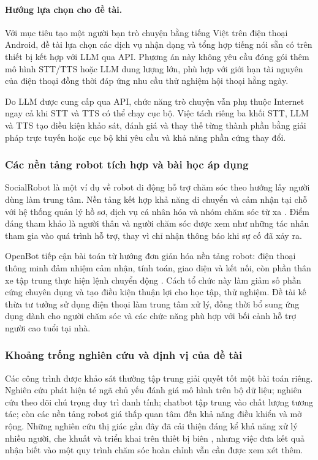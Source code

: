 \paragraph{Hướng lựa chọn cho đề tài.}
Với mục tiêu tạo một người bạn trò chuyện bằng tiếng Việt trên điện thoại Android, đề tài lựa chọn các dịch vụ nhận dạng và tổng hợp tiếng nói sẵn có trên thiết bị kết hợp với LLM qua API. Phương án này không yêu cầu đóng gói thêm mô hình STT/TTS hoặc LLM dung lượng lớn, phù hợp với giới hạn tài nguyên của điện thoại đồng thời đáp ứng nhu cầu thử nghiệm hội thoại hằng ngày.

Do LLM được cung cấp qua API, chức năng trò chuyện vẫn phụ thuộc Internet ngay cả khi STT và TTS có thể chạy cục bộ. Việc tách riêng ba khối STT, LLM và TTS tạo điều kiện khảo sát, đánh giá và thay thế từng thành phần bằng giải pháp trực tuyến hoặc cục bộ khi yêu cầu và khả năng phần cứng thay đổi.

\subsubsection{Các nền tảng robot tích hợp và bài học áp dụng}

SocialRobot là một ví dụ về robot di động hỗ trợ chăm sóc theo hướng lấy người dùng làm trung tâm. Nền tảng kết hợp khả năng di chuyển và cảm nhận tại chỗ với hệ thống quản lý hồ sơ, dịch vụ cá nhân hóa và nhóm chăm sóc từ xa . Điểm đáng tham khảo là người thân và người chăm sóc được xem như những tác nhân tham gia vào quá trình hỗ trợ, thay vì chỉ nhận thông báo khi sự cố đã xảy ra.

OpenBot tiếp cận bài toán từ hướng đơn giản hóa nền tảng robot: điện thoại thông minh đảm nhiệm cảm nhận, tính toán, giao diện và kết nối, còn phần thân xe tập trung thực hiện lệnh chuyển động . Cách tổ chức này làm giảm số phần cứng chuyên dụng và tạo điều kiện thuận lợi cho học tập, thử nghiệm. Đề tài kế thừa tư tưởng sử dụng điện thoại làm trung tâm xử lý, đồng thời bổ sung ứng dụng dành cho người chăm sóc và các chức năng phù hợp với bối cảnh hỗ trợ người cao tuổi tại nhà.

\subsubsection{Khoảng trống nghiên cứu và định vị của đề tài}

Các công trình được khảo sát thường tập trung giải quyết tốt một bài toán riêng. Nghiên cứu phát hiện té ngã chủ yếu đánh giá mô hình trên bộ dữ liệu; nghiên cứu theo dõi chú trọng duy trì danh tính; chatbot tập trung vào chất lượng tương tác; còn các nền tảng robot giá thấp quan tâm đến khả năng điều khiển và mở rộng. Những nghiên cứu thị giác gần đây đã cải thiện đáng kể khả năng xử lý nhiều người, che khuất và triển khai trên thiết bị biên , nhưng việc đưa kết quả nhận biết vào một quy trình chăm sóc hoàn chỉnh vẫn cần được xem xét thêm.

